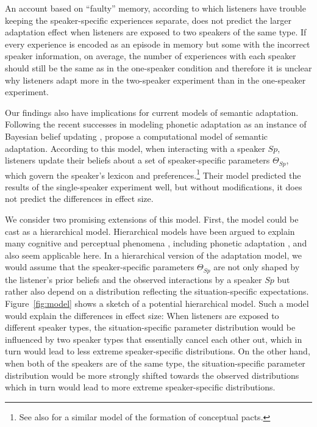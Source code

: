 An account based on ``faulty'' memory, according to which listeners have trouble keeping the 
speaker-specific experiences separate, does not predict the larger adaptation effect
when listeners are exposed to two speakers of the same type. If every experience
is encoded as an episode in memory but some with the incorrect speaker information, on average,
the number of experiences with each speaker should still be the same as in the one-speaker
condition and therefore it is unclear why listeners adapt more in the two-speaker experiment than
in the one-speaker experiment.

Our findings also have implications for current models of semantic adaptation. Following the recent
successes in modeling phonetic adaptation as an instance of Bayesian belief updating \cite{Kleinschmidt2015},
\textcite{Schuster2018} propose a computational model of semantic adaptation. According to this model, when interacting with a speaker 
$Sp$, listeners update their beliefs about a set of speaker-specific parameters $\Theta_{Sp}$, which govern the speaker's lexicon and preferences.\footnote{See 
also \cite{Hawkins2017} for a similar model of the formation of conceptual pacts.} 
Their model predicted the results of the single-speaker experiment well, but without modifications, it does not
predict the differences in effect size.

We consider two promising extensions of this model. First, the model could be cast  as a hierarchical model. 
Hierarchical models
have been argued to explain many cognitive and perceptual phenomena \parencite[see, e.g., ][for a review]{Clark2013}, including
phonetic adaptation \cite{Kleinschmidt2019}, and also seem applicable here. 
In a hierarchical version of the adaptation model, we would assume
that the speaker-specific parameters $\Theta_{Sp}$ are not only shaped by the listener's prior beliefs and 
the observed interactions by a speaker $Sp$ but rather also depend on a distribution reflecting the situation-specific
expectations. Figure~\ref{fig:model} shows a sketch of a potential hierarchical model. Such a model would explain the differences
in effect size: When listeners are exposed to different speaker types, the situation-specific parameter distribution would be influenced
by two speaker types that essentially cancel each other out, which in turn would lead to less extreme speaker-specific distributions. On the other hand, when both
of the speakers are of the same type, the situation-specific parameter distribution would be more strongly shifted towards the observed
distributions which in turn would lead to more extreme speaker-specific distributions.

